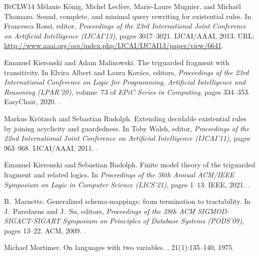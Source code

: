 \documentclass[10pt,a4paper]{amsart}
\theoremstyle{definition}
\numberwithin{equation}{section}
\theoremstyle{plain}
\theoremstyle{definition}
\theoremstyle{myexample}
\theoremstyle{plain}
\theoremstyle{definition}
\begin{document}
\begin{thebibliography}{BtCLW14}
M{\'{e}}lanie K{\"{o}}nig, Michel Lecl{\`{e}}re, Marie{-}Laure Mugnier, and
  Micha{\"{e}}l Thomazo.
\newblock Sound, complete, and minimal query rewriting for existential rules.
\newblock In Francesca Rossi, editor, {\em Proceedings of the 23rd
  International Joint Conference on Artificial Intelligence {(IJCAI'13)}},
  pages 3017--3021. {IJCAI/AAAI}, 2013.
\newblock URL:
  \url{http://www.aaai.org/ocs/index.php/IJCAI/IJCAI13/paper/view/6641}.

Emanuel Kieronski and Adam Malinowski.
\newblock The triguarded fragment with transitivity.
\newblock In Elvira Albert and Laura Kov{\'{a}}cs, editors, {\em Proceedings of
  the 23rd International Conference on Logic for Programming, Artificial
  Intelligence and Reasoning ({LPAR}'20)}, volume~73 of {\em EPiC Series in
  Computing}, pages 334--353. EasyChair, 2020.
\newblock \href {https://doi.org/10.29007/z359} {}.

Markus Kr{\"{o}}tzsch and Sebastian Rudolph.
\newblock Extending decidable existential rules by joining acyclicity and
  guardedness.
\newblock In Toby Walsh, editor, {\em Proceedings of the 22nd International
  Joint Conference on Artificial Intelligence (IJCAI'11)}, pages 963--968.
  {IJCAI/AAAI}, 2011.
\newblock \href {https://doi.org/10.5591/978-1-57735-516-8/IJCAI11-166}
  {}.

Emanuel Kieronski and Sebastian Rudolph.
\newblock Finite model theory of the triguarded fragment and related logics.
\newblock In {\em Proceedings of the 36th Annual {ACM/IEEE} Symposium on Logic
  in Computer Science (LICS'21)}, pages 1--13. {IEEE}, 2021.
\newblock \href {https://doi.org/10.1109/LICS52264.2021.9470734}
  {}.

B.~Marnette.
\newblock Generalized schema-mappings: from termination to tractability.
\newblock In J.~Paredaens and J.~Su, editors, {\em Proceedings of the 28th
  {ACM} {SIGMOD-SIGACT-SIGART} Symposium on Principles of Database Systems
  ({PODS}'09)}, pages 13--22. {ACM}, 2009.
\newblock \href {https://doi.org/10.1145/1559795.1559799}
  {}.

Michael Mortimer.
\newblock On languages with two variables.
, 21(1):135--140, 1975.


\end{thebibliography}
\end{document}
